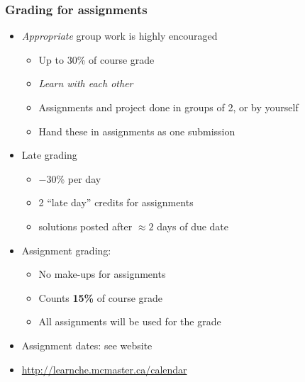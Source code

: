 \begin{frame}\frametitle{Grading for assignments}
	\begin{itemize}
		\item	\emph{Appropriate} group work is highly encouraged 
		\begin{itemize}
			\item	Up to 30\% of course grade 
			\item	\emph{Learn with each other} 
			\item	Assignments and project done in groups of 2, or by yourself 
			\item	Hand these in assignments as one submission 
		\end{itemize}
		\item	Late grading 
		\begin{itemize}
			\item	\( -30 \)\% per day 
			\item	2 ``late day'' credits for assignments 
			\item	solutions posted after $\approx 2$ days of due date 
		\end{itemize}
		\item	Assignment grading: 
		\begin{itemize}
			\item	No make-ups for assignments 
			\item	Counts \textbf{15\%} of course grade 
			\item	All assignments will be used for the grade
		\end{itemize}
		\item	Assignment dates: see website
		\item	\href{http://learnche.mcmaster.ca/calendar}{http://learnche.mcmaster.ca/calendar}
	\end{itemize}
\end{frame}

